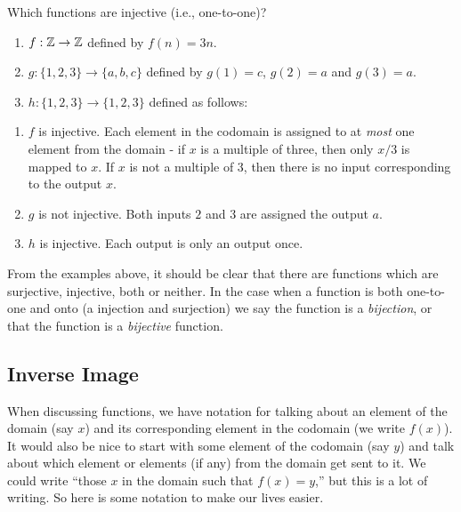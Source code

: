 \documentclass[12pt]{article}
\begin{document}
\begin{example}
  Which functions are injective (i.e., one-to-one)?
    \begin{enumerate}
    \item $f:\mathbb Z \to \mathbb Z$ defined by $f(n) = 3n$.  
    \item $g: \{1,2,3\} \to \{a,b,c\}$ defined by $g(1) = c$, $g(2) = a$ and $g(3) = a$.  
    \item $h:\{1,2,3\} \to \{1,2,3\}$ defined as follows:
    \begin{center}
    \end{center}
  \end{enumerate}
  \begin{solution}
    \begin{enumerate}
      \item $f$ is injective.  Each element in the codomain is assigned to at \emph{most} one element from the domain - if $x$ is a multiple of three, then only $x/3$ is mapped to $x$.  If $x$ is not a multiple of 3, then there is no input corresponding to the output $x$.
      \item $g$ is not injective.  Both inputs $2$ and $3$ are assigned the output $a$.
      \item $h$ is injective.  Each output is only an output once.
    \end{enumerate}

  \end{solution}

\end{example}



From the examples above, it should be clear that there are functions which are surjective, injective, both or neither.  In the case when a function is both one-to-one and onto (a injection and surjection) we say the function is a \emph{bijection}, or that the function is a \emph{bijective} function.  

\subsection{Inverse Image}

When discussing functions, we have notation for talking about an element of the domain (say $x$) and its corresponding element in the codomain (we write $f(x)$).  It would also be nice to start with some element of the codomain (say $y$) and talk about which element or elements (if any) from the domain get sent to it.  We could write ``those $x$ in the domain such that $f(x) = y$,'' but this is a lot of writing.  So here is some notation to make our lives easier.
\end{document}
